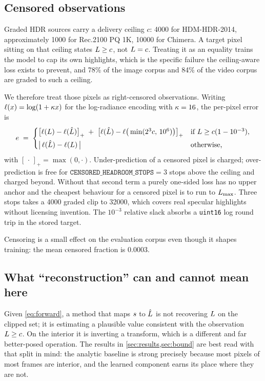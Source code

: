 \subsection{Censored observations}
\label{sec:censoring}

Graded HDR sources carry a delivery ceiling $c$: \SI{4000}{\nits} for
HDM-HDR-2014, approximately \SI{1000}{\nits} for Rec.2100 PQ 1K,
\SI{10000}{\nits} for Chimera. A target pixel sitting on that ceiling states
$L \ge c$, not $L = c$. Treating it as an equality trains the model to cap
its own highlights, which is the specific failure the ceiling-aware loss exists
to prevent, and 78\% of the image corpus and 84\% of the video corpus are graded
to such a ceiling.

We therefore treat those pixels as right-censored observations. Writing
$\ell(x) = \log(1 + \kappa x)$ for the log-radiance encoding with
$\kappa = 16$, the per-pixel error is
\begin{equation}
e \;=\;
\begin{cases}
\big[\ell(L) - \ell(\hat{L})\big]_{+} \;+\; \big[\ell(\hat{L}) - \ell\big(\min(2^{3}c,\, 10^{6})\big)\big]_{+}
  & \text{if } L \ge c(1 - 10^{-3}),\\[4pt]
\big|\,\ell(\hat{L}) - \ell(L)\,\big| & \text{otherwise,}
\end{cases}
\label{eq:censored}
\end{equation}
with $[\,\cdot\,]_{+} = \max(0, \cdot)$. Under-prediction of a censored pixel is
charged; over-prediction is free for
$\texttt{CENSORED\_HEADROOM\_STOPS} = 3$ stops above the ceiling and charged
beyond. Without that second term a purely one-sided loss has no upper anchor and
the cheapest behaviour for a censored pixel is to run to $L_{\max}$. Three stops
takes a \SI{4000}{\nits} graded clip to \SI{32000}{\nits}, which covers real
specular highlights without licensing invention. The $10^{-3}$ relative slack
absorbs a \texttt{uint16} log round trip in the stored target.

Censoring is a small effect on the evaluation corpus even though it shapes
training: the mean censored fraction is \num{0.0003}.

\subsection{What ``reconstruction'' can and cannot mean here}
\label{sec:claim}

Given \cref{eq:forward}, a method that maps $s$ to $\hat{L}$ is not recovering
$L$ on the clipped set; it is estimating a plausible value consistent with
the observation $L \ge c$. On the interior it is inverting a transform, which
is a different and far better-posed operation. The results in
\cref{sec:results,sec:bound} are best read with that split in mind: the analytic
baseline is strong precisely because most pixels of most frames are interior,
and the learned component earns its place where they are not.

